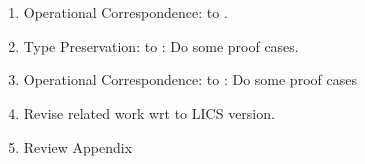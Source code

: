 \section*{}
\begin{enumerate}
	\item	Operational Correspondence: \HOp to \sessp.
	\item	Type Preservation: \HOpp to \HOp: Do some proof cases.
	\item	Operational Correspondence: \pHOp to \HOp: Do some proof cases
	\item	Revise related work wrt to LICS version.
	\item	Review Appendix
\end{enumerate}
